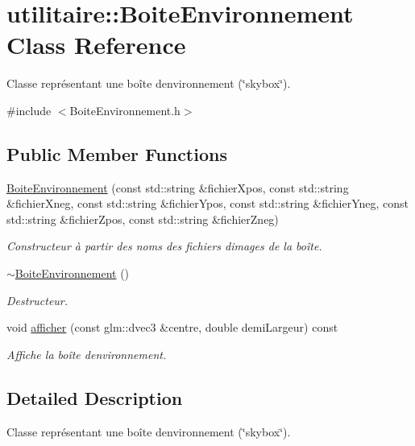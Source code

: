 \hypertarget{classutilitaire_1_1_boite_environnement}{}\section{utilitaire\+:\+:Boite\+Environnement Class Reference}
\label{classutilitaire_1_1_boite_environnement}


Classe représentant une boîte d\textquotesingle{}environnement (\char`\"{}skybox\char`\"{}).  




{\ttfamily \#include $<$Boite\+Environnement.\+h$>$}

\subsection*{Public Member Functions}
\begin{DoxyCompactItemize}
\item 
\hyperlink{classutilitaire_1_1_boite_environnement_afa2e429fd77f584d9b07e1577b907f7b}{Boite\+Environnement} (const std\+::string \&fichier\+Xpos, const std\+::string \&fichier\+Xneg, const std\+::string \&fichier\+Ypos, const std\+::string \&fichier\+Yneg, const std\+::string \&fichier\+Zpos, const std\+::string \&fichier\+Zneg)
\begin{DoxyCompactList}\small\item\em Constructeur à partir des noms des fichiers d\textquotesingle{}images de la boîte. \end{DoxyCompactList}\item 
\hyperlink{classutilitaire_1_1_boite_environnement_accfe35d5a88904e5001653142b985a27}{$\sim$\+Boite\+Environnement} ()
\begin{DoxyCompactList}\small\item\em Destructeur. \end{DoxyCompactList}\item 
void \hyperlink{classutilitaire_1_1_boite_environnement_a41246ea752945870645cfbd5aec673e9}{afficher} (const glm\+::dvec3 \&centre, double demi\+Largeur) const 
\begin{DoxyCompactList}\small\item\em Affiche la boîte d\textquotesingle{}environnement. \end{DoxyCompactList}\end{DoxyCompactItemize}


\subsection{Detailed Description}
Classe représentant une boîte d\textquotesingle{}environnement (\char`\"{}skybox\char`\"{}). 

